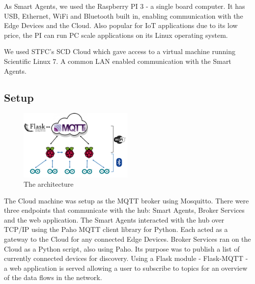 As Smart Agents, we used the Raspberry PI 3 - a single board computer. It has USB, Ethernet, WiFi and Bluetooth built in, enabling communication with the Edge Devices and the Cloud. Also popular for IoT applications due to its low price, the PI can run PC scale applications on its Linux operating system.

We used STFC's SCD Cloud which gave access to a virtual machine running Scientific Linux 7. A common LAN enabled communication with the Smart Agents.


\subsection{Setup}

\begin{figure}
    \centering
    \includegraphics[width=0.5\textwidth]{Architecture.png}
    \caption{The architecture}
    \label{fig:architecture}
\end{figure}

The Cloud machine was setup as the MQTT broker using Mosquitto. There were three endpoints that communicate with the hub: Smart Agents, Broker Services and the web application. The Smart Agents interacted with the hub over TCP/IP using the Paho MQTT client library for Python. Each acted as a gateway to the Cloud for any connected Edge Devices. Broker Services ran on the Cloud as a Python script, also using Paho. Its purpose was to publish a list of currently connected devices for discovery. Using a Flask module - Flask-MQTT - a web application is served allowing a user to subscribe to topics for an overview of the data flows in the network. 

